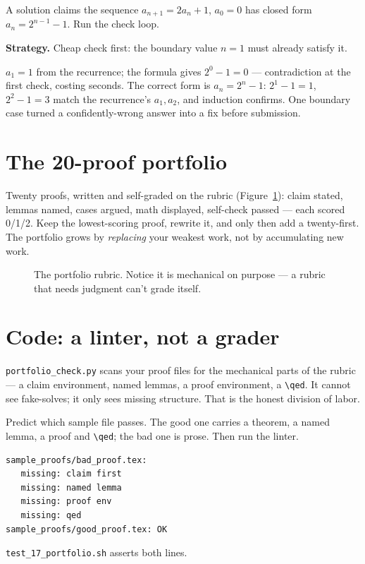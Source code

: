 \begin{example}
A solution claims the sequence $a_{n+1}=2a_n+1$, $a_0=0$ has closed
form $a_n = 2^{n-1}-1$. Run the check loop.
\par\smallskip
\textbf{Strategy.} Cheap check first: the boundary value $n=1$ must
already satisfy it.
\par\smallskip
\begin{solution}
$a_1 = 1$ from the recurrence; the formula gives
$2^0-1=0$ --- contradiction at the first check, costing seconds.
The correct form is $a_n = 2^n - 1$: $2^1-1=1$, $2^2-1=3$ match the
recurrence's $a_1, a_2$, and induction confirms. One boundary case
turned a confidently-wrong answer into a fix before submission.
\end{solution}
\end{example}

\section{The 20-proof portfolio}
Twenty proofs, written and self-graded on the rubric
(Figure~\ref{fig:rubric}): claim stated, lemmas named, cases argued,
math displayed, self-check passed --- each scored 0/1/2. Keep the
lowest-scoring proof, rewrite it, and only then add a twenty-first.
The portfolio grows by \emph{replacing} your weakest work, not by
accumulating new work.
\begin{figure}[ht]\centering

\caption{The portfolio rubric. Notice it is mechanical on purpose ---
a rubric that needs judgment can't grade itself.}
\label{fig:rubric}
\end{figure}

\section{Code: a linter, not a grader}
\texttt{portfolio\_check.py} scans your proof files for the mechanical
parts of the rubric --- a claim environment, named lemmas, a proof
environment, a \verb|\qed|. It cannot see fake-solves; it only sees
missing structure. That is the honest division of labor.
\begin{checkpoint}
Predict which sample file passes. The good one carries a theorem, a
named lemma, a proof and \verb|\qed|; the bad one is prose. Then run
the linter.
\end{checkpoint}
\begin{lstlisting}
sample_proofs/bad_proof.tex:
   missing: claim first
   missing: named lemma
   missing: proof env
   missing: qed
sample_proofs/good_proof.tex: OK
\end{lstlisting}
\texttt{test\_17\_portfolio.sh} asserts both lines.

